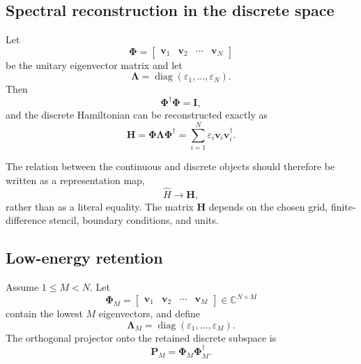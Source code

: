 \subsection{Spectral reconstruction in the discrete space}

Let
\begin{equation}
    \boldsymbol\Phi
    =
    \begin{bmatrix}
        \mathbf v_1 & \mathbf v_2 & \cdots & \mathbf v_N
    \end{bmatrix}
\end{equation}
be the unitary eigenvector matrix and let
\begin{equation}
    \boldsymbol\Lambda
    =
    \operatorname{diag}
    \left(
        \varepsilon_1,\ldots,\varepsilon_N
    \right).
\end{equation}
Then
\begin{equation}
    \boldsymbol\Phi^\dagger\boldsymbol\Phi
    =
    \mathbf I,
\end{equation}
and the discrete Hamiltonian can be reconstructed exactly as
\begin{equation}
    \mathbf H
    =
    \boldsymbol\Phi
    \boldsymbol\Lambda
    \boldsymbol\Phi^\dagger
    =
    \sum_{i=1}^{N}
    \varepsilon_i\mathbf v_i\mathbf v_i^\dagger.
\end{equation}

The relation between the continuous and discrete objects should therefore be
written as a representation map,
\begin{equation}
    \hat H
    \longrightarrow
    \mathbf H,
\end{equation}
rather than as a literal equality. The matrix $\mathbf H$ depends on the
chosen grid, finite-difference stencil, boundary conditions, and units.

\subsection{Low-energy retention}

Assume $1\leq M<N$. Let
\begin{equation}
    \boldsymbol\Phi_M
    =
    \begin{bmatrix}
        \mathbf v_1 & \mathbf v_2 & \cdots & \mathbf v_M
    \end{bmatrix}
    \in\mathbb C^{N\times M}
\end{equation}
contain the lowest $M$ eigenvectors, and define
\begin{equation}
    \boldsymbol\Lambda_M
    =
    \operatorname{diag}
    \left(
        \varepsilon_1,\ldots,\varepsilon_M
    \right).
\end{equation}
The orthogonal projector onto the retained discrete subspace is
\begin{equation}
    \mathbf P_M
    =
    \boldsymbol\Phi_M\boldsymbol\Phi_M^\dagger.
\end{equation}

